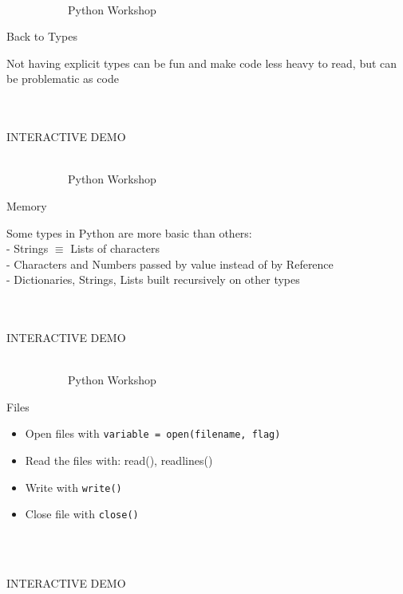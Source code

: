\documentclass[10pt, xcolor=dvisnames]{beamer}
\begin{document}
\begin{frame}{{\tiny \ \\\vspace{-13pt} \ \ \ \ \ \ \ \ \ \ \ Python Workshop}\\ \centerline{Back to Types}}
\vspace*{-50pt}

Not having explicit types can be fun and make code less heavy to read, but can be problematic as code \\



\ \\
\ \\
\centerline{INTERACTIVE DEMO}


\end{frame}








\begin{frame}{{\tiny \ \\\vspace{-13pt} \ \ \ \ \ \ \ \ \ \ \ Python Workshop}\\ \centerline{Memory}}
\vspace*{-50pt}

Some types in Python are more basic than others:\\
- Strings $\equiv$ Lists of characters\\
- Characters and Numbers passed by value instead of by Reference\\
- Dictionaries, Strings, Lists built recursively on other types\\



\ \\
\ \\
\centerline{INTERACTIVE DEMO}


\end{frame}





\begin{frame}{{\tiny \ \\\vspace{-13pt} \ \ \ \ \ \ \ \ \ \ \ Python Workshop}\\ \centerline{Files}}
\vspace*{-50pt}

\begin{itemize}
\item Open files with \texttt{variable = open(filename, flag)}
\item Read the files with: read(), readlines()
\item Write with \texttt{write()}
\item Close file with \texttt{close()} 
\end{itemize}


\ \\
\ \\
\centerline{INTERACTIVE DEMO}


\end{frame}
\end{document}
